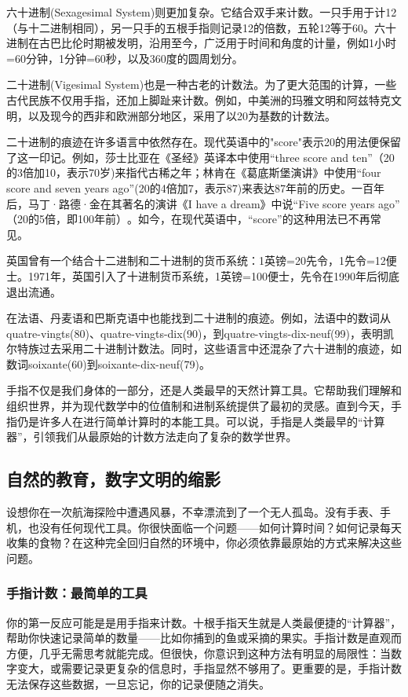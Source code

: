 六十进制(Sexagesimal System)则更加复杂。它结合双手来计数。一只手用于计12（与十二进制相同），另一只手的五根手指则记录12的倍数，五轮12等于60。六十进制在古巴比伦时期被发明，沿用至今，广泛用于时间和角度的计量，例如1小时=60分钟，1分钟=60秒，以及360度的圆周划分。

二十进制(Vigesimal System)也是一种古老的计数法。为了更大范围的计算，一些古代民族不仅用手指，还加上脚趾来计数。例如，中美洲的玛雅文明和阿兹特克文明，以及现今的西非和欧洲部分地区，采用了以20为基数的计数法。

二十进制的痕迹在许多语言中依然存在。现代英语中的"score"表示20的用法便保留了这一印记。例如，莎士比亚在《圣经》英译本中使用“three score and ten”（20的3倍加10，表示70岁)来指代古稀之年；林肯在《葛底斯堡演讲》中使用“four score and seven years ago”(20的4倍加7，表示87)来表达87年前的历史。一百年后，马丁·路德·金在其著名的演讲《I have a dream》中说“Five score years ago”​（20的5倍，即100年前）​。如今，在现代英语中，“score”的这种用法已不再常见。

英国曾有一个结合十二进制和二十进制的货币系统：1英镑=20先令，1先令=12便士。1971年，英国引入了十进制货币系统，1英镑=100便士，先令在1990年后彻底退出流通。

在法语、丹麦语和巴斯克语中也能找到二十进制的痕迹。例如，法语中的数词从quatre-vingts(80)​、quatre-vingts-dix(90)​，到quatre-vingts-dix-neuf(99)，表明凯尔特族过去采用二十进制计数法。同时，这些语言中还混杂了六十进制的痕迹，如数词soixante(60)到soixante-dix-neuf(79)。

手指不仅是我们身体的一部分，还是人类最早的天然计算工具。它帮助我们理解和组织世界，并为现代数学中的位值制和进制系统提供了最初的灵感。直到今天，手指仍是许多人在进行简单计算时的本能工具。可以说，手指是人类最早的“计算器”，引领我们从最原始的计数方法走向了复杂的数学世界。

\subsection{自然的教育，数字文明的缩影}
设想你在一次航海探险中遭遇风暴，不幸漂流到了一个无人孤岛。没有手表、手机，也没有任何现代工具。你很快面临一个问题——如何计算时间？如何记录每天收集的食物？在这种完全回归自然的环境中，你必须依靠最原始的方式来解决这些问题。

\subsubsection{手指计数：最简单的工具}
你的第一反应可能是是用手指来计数。十根手指天生就是人类最便捷的“计算器”，帮助你快速记录简单的数量——比如你捕到的鱼或采摘的果实。手指计数是直观而方便，几乎无需思考就能完成。但很快，你意识到这种方法有明显的局限性：当数字变大，或需要记录更复杂的信息时，手指显然不够用了。更重要的是，手指计数无法保存这些数据，一旦忘记，你的记录便随之消失。

